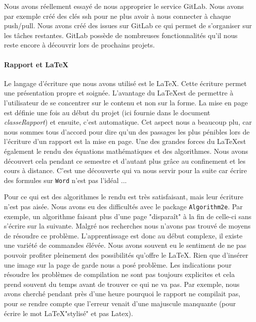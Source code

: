                     Nous avons réellement essayé de nous approprier le service GitLab. Nous avons par exemple créé des clés ssh pour ne plus  avoir à nous connecter à chaque push/pull. Nous avons créé des issues sur GitLab ce qui permet de s'organiser sur les tâches restantes. GitLab possède de nombreuses fonctionnalités qu'il nous reste encore à découvrir lors de prochains projets.
            
                \paragraph{Rapport et \LaTeX}
                    Le langage d'écriture que nous avons utilisé est le \LaTeX. Cette écriture permet une présentation propre et soignée. L'avantage du \LaTeX est de permettre à l'utilisateur de se concentrer sur le contenu et non sur la forme. La mise en page est définie une fois au début du projet (ici fournie dans le document \textit{classeRapport}) et ensuite, c'est automatique. Cet aspect nous a beaucoup plu, car nous sommes tous d'accord pour dire qu'un des passages les plus pénibles lors de l'écriture d'un rapport est la mise en page. Une des grandes forces du \LaTeX est également le rendu des équations mathématiques et des algorithmes. Nous avons découvert cela pendant ce semestre et d'autant plus grâce au confinement et les cours à distance. C'est une découverte qui va nous servir pour la suite car écrire des formules sur \verb|Word| n'est pas l'idéal ... 
                    
                    Pour ce qui est des algorithmes le rendu est très satisfaisant, mais leur écriture n'est pas aisée. Nous avons eu des difficultés avec le package \verb|Algorithm2e|. Par exemple, un algorithme faisant plus d'une page "disparaît" à la fin de celle-ci sans s'écrire sur la suivante. Malgré nos recherches nous n'avons pas trouvé de moyens de résoudre ce problème. 
                    L'apprentissage est donc au début complexe, il existe une variété de commandes élévée. Nous avons souvent eu le sentiment de ne pas pouvoir profiter pleinement des possibilités qu'offre le \LaTeX. Rien que d'insérer une image sur la page de garde nous a posé problème. Les indications pour résoudre les problèmes de compilation ne sont pas toujours explicites et cela prend souvent du temps avant de trouver ce qui ne va pas. Par exemple, nous avons cherché pendant près d'une heure pourquoi le rapport ne compilait pas, pour se rendre compte que l'erreur venait d'une majuscule manquante (pour écrire le mot \LaTeX "stylisé" et pas Latex). 
            
